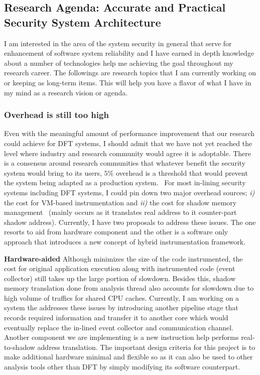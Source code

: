 \documentclass[letterpaper, 10pt]{article}
\begin{document}
\begin{small}
\subsection*{Research Agenda: Accurate and Practical Security System
Architecture} 
%
I am interested in the area of the system security in general that serve for
enhancement of software system reliability and I have earned in depth knowledge
about a number of technologies help me achieving the goal throughout my
research career. 
%
The followings are research topics that I am currently working on or keeping as
long-term items. This will help you have a flavor of what I have in my mind as
a research vision or agenda. 
%
\subsubsection*{Overhead is still too high} 
%
Even with the meaningful amount of performance improvement that our research
could achieve for DFT systems, I should admit that we have not yet reached the
level where industry and research community would agree it is adoptable. 
There is a consensus around research communities that whatever benefit the
security system would bring to its users, $5\%$ overhead is a threshold that
would prevent the system being adapted as a production
system.~\cite{ccs2013:invited_talk}
%
For most in-lining security systems including DFT systems, I could pin down two
major overhead sources; {\it i)} the cost for VM-based instrumentation and {\it
ii)} the cost for shadow memory management ~(mainly occurs as it translates
real address to it counter-part shadow address).
%
Currently, I have two proposals to address these issues. The one resorts to aid
from hardware component and the other is a software only approach that
introduces a new concept of hybrid instrumentation framework. 

%

{\bf Hardware-aided \SR} Although \SR minimizes the size of the code
instrumented, the cost for original application execution along with
instrumented code (event collector) still takes up the large portion of
slowdown.  Besides this, shadow memory translation done from analysis thread
also accounts for slowdown due to high volume of traffics for shared CPU
caches. 
%
Currently, I am working on a system the addresses these issues by introducing
another pipeline stage that records required information and transfer it to
another core which would eventually replace the in-lined event collector and
communication channel. Another component we are implementing is a new
instruction help performs real-to-shadow address translation. The important
design criteria for this project is to make additional hardware minimal and
flexible so as it can also be used to other analysis tools other than DFT by 
simply modifying its software counterpart.


\end{small}
\end{document}
